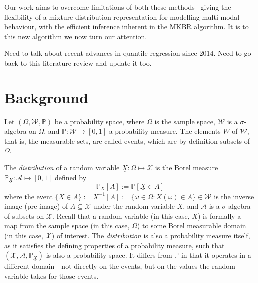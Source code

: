 \documentclass[twoside]{article} \usepackage{aistats2017}
\theoremstyle{definition}
\theoremstyle{remark}
\newcommand{\rv}[1]{\underline{#1}}
\newcommand{\warn}[1]{{\color{RedOrange} #1}}
\newcommand{\extra}[1]{{\color{ForestGreen} #1}}
\begin{document}


	Our work aims to overcome limitations of both these methods-- giving the flexibility of a mixture distribution representation for modelling multi-modal behaviour, with the efficient inference inherent in the MKBR algorithm. It is to this new algorithm we now turn our attention.

	\warn{Need to talk about recent advances in quantile regression since 2014. Need to go back to this literature review and update it too.}
	
\section{Background}
\label{sec:background}
	
		Let $(\Omega, \mathcal{W}, \mathbb{P})$ be a probability space, where $\Omega$ is the sample space, $\mathcal{W}$ is a $\sigma$-algebra on $\Omega$, and $\mathbb{P} : \mathcal{W} \mapsto [0, 1]$ a probability measure. The elements $W$ of $\mathcal{W}$, that is, the measurable sets, are called events, which are by definition subsets of $\Omega$.
		
		The \textit{distribution} of a random variable $\rv{X} : \Omega \mapsto \mathcal{X}$ is the Borel measure $\mathbb{P}_{\rv{X}} : \mathcal{A} \mapsto [0, 1]$ defined by
		\begin{equation}
			\mathbb{P}_{\rv{X}}[A] := \mathbb{P}[\rv{X} \in A]
		\label{eq:distribution}
		\end{equation}
		where the event $\{\rv{X} \in A\} := \rv{X}^{-1}[A] := \{\omega \in \Omega : \rv{X}(\omega) \in A\} \in \mathcal{W}$ is the inverse image (pre-image) of $A \subseteq \mathcal{X}$ under the random variable $\rv{X}$, and $\mathcal{A}$ is a $\sigma$-algebra of subsets on $\mathcal{X}$. \extra{Recall that a random variable (in this case, $\rv{X}$) is formally a map from the sample space (in this case, $\Omega$) to some Borel measurable domain (in this case, $\mathcal{X}$) of interest. The \textit{distribution} is also a probability measure itself, as it satisfies the defining properties of a probability measure, such that $(\mathcal{X}, \mathcal{A}, \mathbb{P}_{\rv{X}})$ is also a probability space. It differs from $\mathbb{P}$ in that it operates in a different domain - not directly on the events, but on the values the random variable takes for those events.}
		
\end{document}
